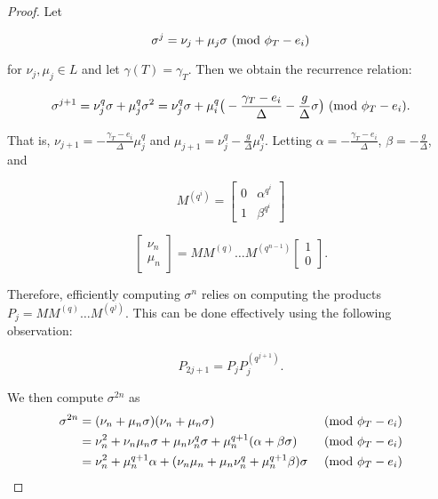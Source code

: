 \documentclass{jams-l}
\theoremstyle{remark}
\numberwithin{equation}{section}
\begin{document}
\begin{proof}
Let 

\[ \sigma^j = \nu_j + \mu_j \sigma \textnormal{ (mod } \phi_{T} - e_i \textnormal{)}\]

\noindent for $\nu_j, \mu_j \in L$ and let $\gamma(T) = \gamma_T$. Then we obtain the recurrence relation:

\[\sigma^{j+1} = \nu_j^q \sigma + \mu_j^q \sigma^2 = \nu_j^q \sigma + \mu_i^q\big( -\frac{\gamma_T - e_i}{\Delta} - \frac{g}{\Delta} \sigma \big) \textnormal{ (mod } \phi_{T} - e_i \textnormal{)}. \]

\noindent That is, $\nu_{j+1} = -\frac{\gamma_T - e_i}{\Delta}\mu_{j}^q$ and $\mu_{j + 1} = \nu_j^q - \frac{g}{\Delta} \mu_j^q$. Letting $\alpha = -\frac{\gamma_T - e_i}{\Delta}$, $\beta = - \frac{g}{\Delta}$, and

\[ M^{(q^i)} = \begin{bmatrix} 0 & \alpha^{q^i} \\ 1 & \beta^{q^i} \end{bmatrix} \]

\[ \begin{bmatrix} \nu_{n} \\ \mu_n  \end{bmatrix} = M M^{(q)} \ldots M^{(q^{n-1})}  \begin{bmatrix} 1 \\ 0  \end{bmatrix}. \]


\noindent Therefore, efficiently computing $\sigma^n$ relies on computing the products $ P_j = M M^{(q)} \ldots M^{(q^j)}$. This can be done effectively using the following observation:

\[ P_{2j + 1} = P_{j} P_{j}^{(q^{j+1})}.\]

\noindent We then compute $\sigma^{2n}$ as
\begin{align*}
\sigma^{2n} & = (\nu_n + \mu_n \sigma)(\nu_n + \mu_n \sigma) & \textnormal{ (mod } \phi_{T} - e_i \textnormal{)} \\
 & = \nu_n^2 + \nu_n\mu_n \sigma + \mu_n\nu_n^q \sigma + \mu_n^{q+1} (\alpha + \beta \sigma) & \textnormal{ (mod } \phi_{T} - e_i \textnormal{)}\\
 & = \nu_n^2 + \mu_n^{q + 1} \alpha + (\nu_n \mu_n + \mu_n \nu_n^q + \mu_n^{q+1}\beta)\sigma & \textnormal{ (mod } \phi_{T} - e_i \textnormal{)}
\end{align*}


\end{proof}
\end{document}
